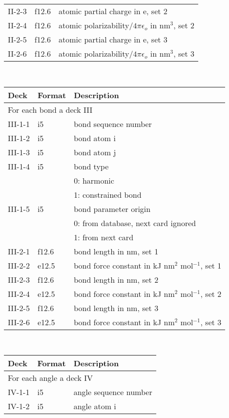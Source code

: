 \begin{center}
\begin{tabular*}{150mm}{p{12mm}p{12mm}l}
II-2-3  & f12.6  & atomic partial charge in e, set 2\\
II-2-4  & f12.6  & atomic polarizability/$4\pi\epsilon_o$ in nm$^3$, set 2\\
II-2-5  & f12.6  & atomic partial charge in e, set 3\\
II-2-6  & f12.6  & atomic polarizability/$4\pi\epsilon_o$ in nm$^3$, set 3\\
\hline
\end{tabular*}\\
\begin{tabular*}{150mm}{p{12mm}p{12mm}l}
\hline\hline
Deck & Format & Description \\ \hline
\multicolumn{3}{l}{For each bond a deck III} \\
III-1-1 & i5     & bond sequence number \\
III-1-2 & i5     & bond atom i \\
III-1-3 & i5     & bond atom j \\
III-1-4 & i5     & bond type \\
        &        & 0: harmonic\\
        &        & 1: constrained bond\\
III-1-5 & i5     & bond parameter origin\\
        &        & 0: from database, next card ignored \\
        &        & 1: from next card\\
III-2-1 & f12.6  & bond length in nm, set 1\\
III-2-2 & e12.5  & bond force constant in kJ nm$^2$ mol$^{-1}$, set 1 \\
III-2-3 & f12.6  & bond length in nm, set 2\\
III-2-4 & e12.5  & bond force constant in kJ nm$^2$ mol$^{-1}$, set 2 \\
III-2-5 & f12.6  & bond length in nm, set 3\\
III-2-6 & e12.5  & bond force constant in kJ nm$^2$ mol$^{-1}$, set 3 \\
\hline
\end{tabular*}\\
\begin{tabular*}{150mm}{p{12mm}p{12mm}l}
\hline\hline
Deck & Format & Description \\ \hline
\multicolumn{3}{l}{For each angle a deck IV} \\
IV-1-1 & i5     & angle sequence number \\
IV-1-2 & i5     & angle atom i \\

\end{tabular*}
\end{center}
